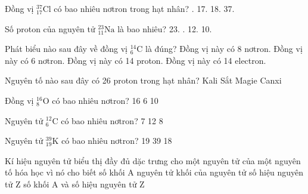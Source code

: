 \begin{ex}%
	Đồng vị $_{17}^{37}\text{Cl}$ có bao nhiêu nơtron trong hạt nhân?
	\choice
	{.}
	{17.}
	{18.}
	{37.}
\end{ex}
\begin{ex}%
	Số proton của nguyên tử $^{23}_{11}\text{Na}$ là bao nhiêu?
	\choice
	{23.}
	{.}
	{12.}
	{10.}
\end{ex}
\begin{ex}%
	Phát biểu nào sau đây về đồng vị $^{14}_{6}\text{C}$ là đúng?
	\choice
	{\True Đồng vị này có 8 nơtron.}
	{Đồng vị này có 6 nơtron.}
	{Đồng vị này có 14 proton.}
	{Đồng vị này có 14 electron.}
\end{ex}
\begin{ex}%
	Nguyên tố nào sau đây có 26 proton trong hạt nhân?
	\choice
	{Kali}
	{\True Sắt}
	{Magie}
	{Canxi}
\end{ex}
\begin{ex}%
	Đồng vị $^{16}_{8}\text{O}$ có bao nhiêu nơtron?
	\choice
	{}
	{16}
	{6}
	{10}
\end{ex}
\begin{ex}%
	Nguyên tử $^{12}_{6}\text{C}$ có bao nhiêu nơtron?
	\choice
	{7}
	{}
	{12}
	{8}
\end{ex}
\begin{ex}%
	Nguyên tử $^{39}_{19}\text{K}$ có bao nhiêu nơtron?
	\choice
	{19}
	{}
	{39}
	{18}
\end{ex}
\begin{ex}
	Kí hiệu nguyên tử biểu thị đầy đủ dặc trưng cho một nguyên tử của một nguyên tố hóa học vì nó cho biết
	\choice
	{số khối A}
	{nguyên tử khối của nguyên tử}
	{số hiệu nguyên tử Z}
	{\True số khối A và số hiệu nguyên tử Z}
\end{ex}
